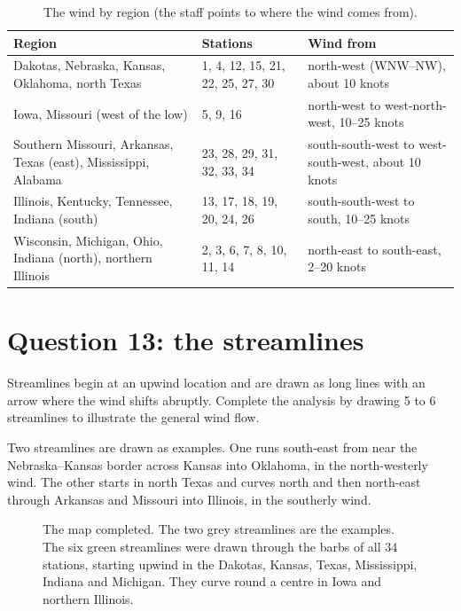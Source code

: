 \begin{table}[ht]
\centering
\caption{The wind by region (the staff points to where the wind comes from).}
\small
\begin{tabularx}{\textwidth}{@{}p{4.6cm}p{3.6cm}X@{}}
\toprule
\textbf{Region} & \textbf{Stations} & \textbf{Wind from}\\
\midrule
Dakotas, Nebraska, Kansas, Oklahoma, north Texas & 1, 4, 12, 15, 21, 22, 25, 27, 30 & north-west (WNW--NW), about 10 knots\\
Iowa, Missouri (west of the low) & 5, 9, 16 & north-west to west-north-west, 10--25 knots\\
Southern Missouri, Arkansas, Texas (east), Mississippi, Alabama & 23, 28, 29, 31, 32, 33, 34 & south-south-west to west-south-west, about 10 knots\\
Illinois, Kentucky, Tennessee, Indiana (south) & 13, 17, 18, 19, 20, 24, 26 & south-south-west to south, 10--25 knots\\
Wisconsin, Michigan, Ohio, Indiana (north), northern Illinois & 2, 3, 6, 7, 8, 10, 11, 14 & north-east to south-east, 2--20 knots\\
\bottomrule
\end{tabularx}
\end{table}

\section{Question 13: the streamlines}

\begin{questionbox}
Streamlines begin at an upwind location and are drawn as long lines with an arrow where the wind shifts abruptly. Complete the analysis by drawing 5 to 6 streamlines to illustrate the general wind flow.
\end{questionbox}

Two streamlines are drawn as examples. One runs south-east from near the Nebraska--Kansas border across Kansas into Oklahoma, in the north-westerly wind. The other starts in north Texas and curves north and then north-east through Arkansas and Missouri into Illinois, in the southerly wind.

\begin{figure}[ht]
\centering
\mapbase{0.0196cm}{}
\caption{The map completed. The two grey streamlines are the examples. The six green streamlines were drawn through the barbs of all 34 stations, starting upwind in the Dakotas, Kansas, Texas, Mississippi, Indiana and Michigan. They curve round a centre in Iowa and northern Illinois.}\label{p3-fig:streams}
\end{figure}

